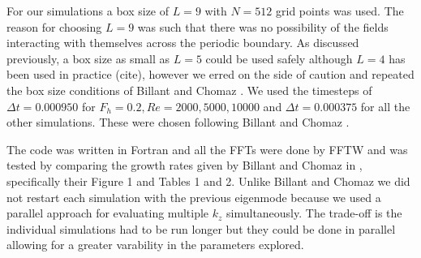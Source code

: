 For our simulations a box size of $L=9$ with $N=512$ grid points was used. The reason for choosing $L=9$ was such that there was no possibility of the fields interacting with themselves across the periodic boundary. As discussed previously, a box size as small as $L=5$ could be used safely although $L=4$ has been used in practice (cite), however we erred on the side of caution and repeated the box size conditions of Billant and Chomaz \cite{bc2000c}.  We used the timesteps of $\Delta t=0.000950$ for $F_{h}=0.2,Re=2000,5000,10000$ and $\Delta t=0.000375$ for all the other simulations. These were chosen following Billant and Chomaz \cite{bc2000c}. 


The code was written in Fortran and all the FFTs were done by FFTW \cite{fftw} and was tested by comparing the growth rates given by Billant and Chomaz in \cite{bc2000c}, specifically their Figure  1 and Tables 1 and 2. Unlike Billant and Chomaz \cite{bc2000c} we did not restart each simulation with the previous eigenmode because we used a parallel approach for evaluating multiple $k_{z}$ simultaneously. The trade-off is the individual simulations had to be run longer but they could be done in parallel allowing for a greater varability in the parameters explored. 



